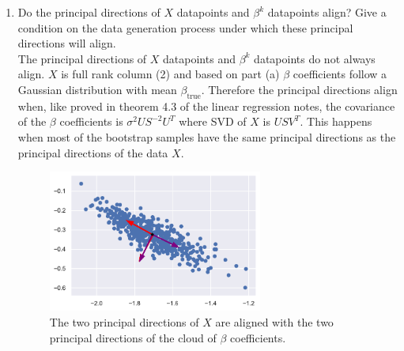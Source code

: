 \documentclass[12pt,twoside]{article}
\begin{document}
\begin{enumerate}
\begin{enumerate}
\item Do the principal directions of $X$ datapoints and $\beta^k$ datapoints align? Give a condition on the data generation process under which these principal directions will align. \\

\medskip
The principal directions of $X$ datapoints and $\beta^k$ datapoints do not always align. $X$ is full rank column (2) and based on  part (a) $\beta$ coefficients follow 
a Gaussian distribution with mean $\beta_{\text{true}}$. Therefore the principal directions align when,
like proved in theorem 4.3 of the linear regression notes, the covariance of the $\beta$ coefficients is $\sigma^2 U S^{-2} U^T$ where SVD of $X$ is $U S V^T$.
This happens when most of the bootstrap samples have the same principal directions as the principal directions of the data $X$.
 
 	\begin{figure}[H]
		\centering
		\includegraphics[width=200pt]{figures/scatter_plot_2.pdf}
		\caption{The two principal directions of $X$ are aligned with the two principal directions of the cloud of $\beta$ coefficients.}
		\label{fig3}
	\end{figure}

\end{enumerate}
\end{enumerate}
\end{document}
